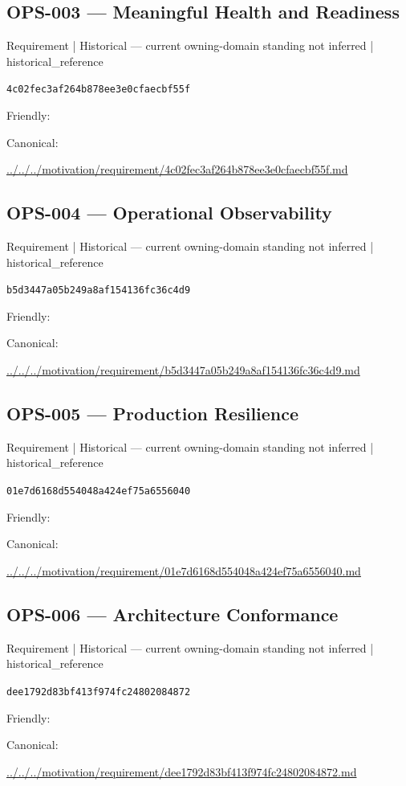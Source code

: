 \documentclass[10pt,a4paper]{article}
\begin{document}
\subsection*{OPS-003 — Meaningful Health and Readiness}
{\small Requirement | Historical — current owning-domain standing not inferred | historical\_reference}\par
\texttt{4c02fec3af264b878ee3e0cfaecbf55f}\par
Friendly: \par
Canonical: \par
{\footnotesize\url{../../../motivation/requirement/4c02fec3af264b878ee3e0cfaecbf55f.md}}\par
\subsection*{OPS-004 — Operational Observability}
{\small Requirement | Historical — current owning-domain standing not inferred | historical\_reference}\par
\texttt{b5d3447a05b249a8af154136fc36c4d9}\par
Friendly: \par
Canonical: \par
{\footnotesize\url{../../../motivation/requirement/b5d3447a05b249a8af154136fc36c4d9.md}}\par
\subsection*{OPS-005 — Production Resilience}
{\small Requirement | Historical — current owning-domain standing not inferred | historical\_reference}\par
\texttt{01e7d6168d554048a424ef75a6556040}\par
Friendly: \par
Canonical: \par
{\footnotesize\url{../../../motivation/requirement/01e7d6168d554048a424ef75a6556040.md}}\par
\subsection*{OPS-006 — Architecture Conformance}
{\small Requirement | Historical — current owning-domain standing not inferred | historical\_reference}\par
\texttt{dee1792d83bf413f974fc24802084872}\par
Friendly: \par
Canonical: \par
{\footnotesize\url{../../../motivation/requirement/dee1792d83bf413f974fc24802084872.md}}\par
\end{document}
